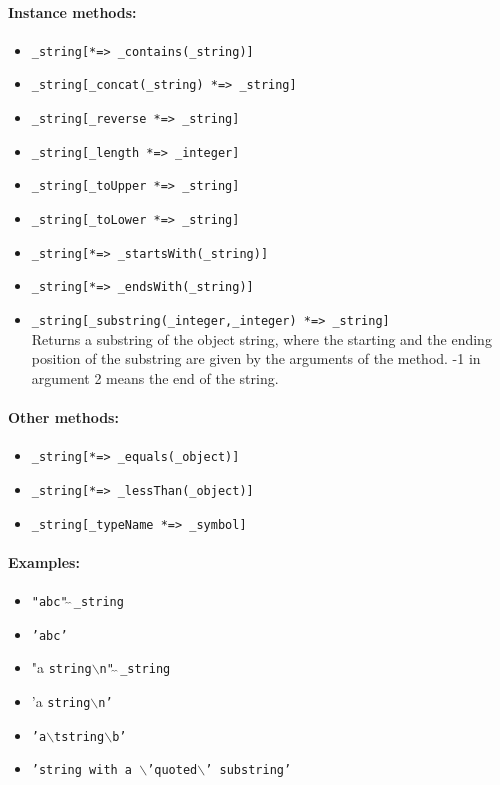 \documentclass[11pt]{article}
\begin{document}
\paragraph{Instance  methods:}
\begin{itemize}
\item {\tt \_string[*=> \_contains(\_string)]}  
\item {\tt \_string[\_concat(\_string) *=> \_string]}  
\item {\tt \_string[\_reverse *=> \_string]}  
\item {\tt \_string[\_length *=> \_integer]}  
\item {\tt \_string[\_toUpper *=> \_string]}  
\item {\tt \_string[\_toLower *=> \_string]}  
\item {\tt \_string[*=> \_startsWith(\_string)]}  
\item {\tt \_string[*=> \_endsWith(\_string)]}  
\item {\tt \_string[\_substring(\_integer,\_integer) *=> \_string]}  
  \\
  Returns a substring of the object string, where the starting and the
  ending position of the substring are given by the arguments of the
  method. -1 in argument 2 means the end of the string.
\end{itemize}

\paragraph{Other methods:}
\begin{itemize}
\item {\tt \_string[*=> \_equals(\_object)]}  
\item {\tt \_string[*=> \_lessThan(\_object)]}  
\item {\tt \_string[\_typeName *=> \_symbol]}  
\end{itemize}

\paragraph{Examples:}
\begin{itemize}
\item {\tt "abc"$\hat{~}\hat{~}$\_string} 
\item {\tt 'abc'} 
\item "a {\tt string$\backslash$n"$\hat{~}\hat{~}$\_string} 
\item 'a {\tt string$\backslash$n'} 
\item {\tt 'a$\backslash$tstring$\backslash$b'} 
\item {\tt 'string with a $\backslash$'quoted$\backslash$' substring'}
\end{itemize}
\end{document}
